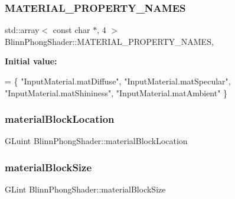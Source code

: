 \subsubsection{\texorpdfstring{M\+A\+T\+E\+R\+I\+A\+L\+\_\+\+P\+R\+O\+P\+E\+R\+T\+Y\+\_\+\+N\+A\+M\+ES}{MATERIAL\_PROPERTY\_NAMES}}
{\footnotesize\ttfamily std\+::array$<$ const char $\ast$, 4 $>$ Blinn\+Phong\+Shader\+::\+M\+A\+T\+E\+R\+I\+A\+L\+\_\+\+P\+R\+O\+P\+E\+R\+T\+Y\+\_\+\+N\+A\+M\+ES\hspace{0.3cm}{\ttfamily [static]}, {\ttfamily [protected]}}

{\bfseries Initial value\+:}
\begin{DoxyCode}
= \{
    \textcolor{stringliteral}{"InputMaterial.matDiffuse"},
    \textcolor{stringliteral}{"InputMaterial.matSpecular"},
    \textcolor{stringliteral}{"InputMaterial.matShininess"},
    \textcolor{stringliteral}{"InputMaterial.matAmbient"}
\}
\end{DoxyCode}
\hypertarget{class_blinn_phong_shader_a4dcd123c2284945734df697501dca5ea}{}\label{class_blinn_phong_shader_a4dcd123c2284945734df697501dca5ea}
\subsubsection{\texorpdfstring{material\+Block\+Location}{materialBlockLocation}}
{\footnotesize\ttfamily G\+Luint Blinn\+Phong\+Shader\+::material\+Block\+Location\hspace{0.3cm}{\ttfamily [protected]}}

\hypertarget{class_blinn_phong_shader_af38b3d042773f6568f0f6c227de85990}{}\label{class_blinn_phong_shader_af38b3d042773f6568f0f6c227de85990}
\subsubsection{\texorpdfstring{material\+Block\+Size}{materialBlockSize}}
{\footnotesize\ttfamily G\+Lint Blinn\+Phong\+Shader\+::material\+Block\+Size\hspace{0.3cm}{\ttfamily [protected]}}

\hypertarget{class_blinn_phong_shader_a85dbf4a8376a98570a06d9df17938cf4}{}\label{class_blinn_phong_shader_a85dbf4a8376a98570a06d9df17938cf4}
